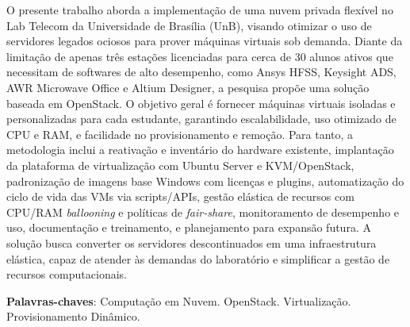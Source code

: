 \begin{resumo}

O presente trabalho aborda a implementação de uma nuvem privada flexível no Lab Telecom da Universidade de Brasília (UnB), visando otimizar o uso de servidores legados ociosos para prover máquinas virtuais sob demanda. Diante da limitação de apenas três estações licenciadas para cerca de 30 alunos ativos que necessitam de softwares de alto desempenho, como Ansys HFSS, Keysight ADS, AWR Microwave Office e Altium Designer, a pesquisa propõe uma solução baseada em OpenStack. O objetivo geral é fornecer máquinas virtuais isoladas e personalizadas para cada estudante, garantindo escalabilidade, uso otimizado de CPU e RAM, e facilidade no provisionamento e remoção. Para tanto, a metodologia inclui a reativação e inventário do hardware existente, implantação da plataforma de virtualização com Ubuntu Server e KVM/OpenStack, padronização de imagens base Windows com licenças e plugins, automatização do ciclo de vida das VMs via scripts/APIs, gestão elástica de recursos com CPU/RAM \textit{ballooning} e políticas de \textit{fair-share}, monitoramento de desempenho e uso, documentação e treinamento, e planejamento para expansão futura. A solução busca converter os servidores descontinuados em uma infraestrutura elástica, capaz de atender às demandas do laboratório e simplificar a gestão de recursos computacionais.

 \vspace{\onelineskip}
    
 \noindent
 \textbf{Palavras-chaves}: Computação em Nuvem. OpenStack. Virtualização. Provisionamento Dinâmico.
\end{resumo}

